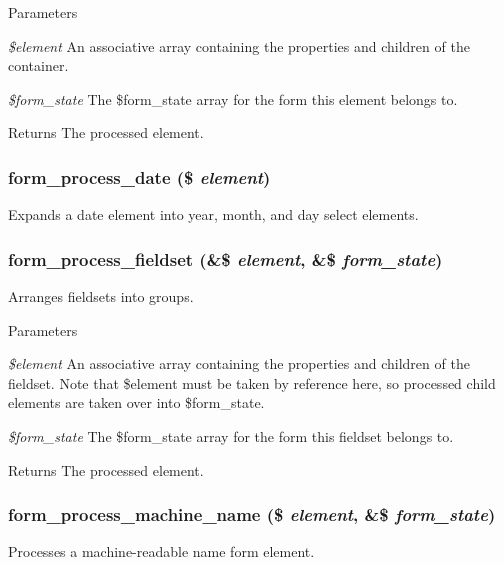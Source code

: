 \begin{DoxyParams}{Parameters}
\item[{\em \$element}]An associative array containing the properties and children of the container. \item[{\em \$form\_\-state}]The \$form\_\-state array for the form this element belongs to.\end{DoxyParams}
\begin{DoxyReturn}{Returns}
The processed element. 
\end{DoxyReturn}
\hypertarget{group__form__api_gabc6b74cff84954f970d4997390473160}{
\subsubsection[{form\_\-process\_\-date}]{\setlength{\rightskip}{0pt plus 5cm}form\_\-process\_\-date (\$ {\em element})}}
\label{group__form__api_gabc6b74cff84954f970d4997390473160}
Expands a date element into year, month, and day select elements. \hypertarget{group__form__api_gae2acfa7f531c487ac930d3a819ee63b5}{
\subsubsection[{form\_\-process\_\-fieldset}]{\setlength{\rightskip}{0pt plus 5cm}form\_\-process\_\-fieldset (\&\$ {\em element}, \/  \&\$ {\em form\_\-state})}}
\label{group__form__api_gae2acfa7f531c487ac930d3a819ee63b5}
Arranges fieldsets into groups.


\begin{DoxyParams}{Parameters}
\item[{\em \$element}]An associative array containing the properties and children of the fieldset. Note that \$element must be taken by reference here, so processed child elements are taken over into \$form\_\-state. \item[{\em \$form\_\-state}]The \$form\_\-state array for the form this fieldset belongs to.\end{DoxyParams}
\begin{DoxyReturn}{Returns}
The processed element. 
\end{DoxyReturn}
\hypertarget{group__form__api_gacc2045f1fc86919221685bd809d22812}{
\subsubsection[{form\_\-process\_\-machine\_\-name}]{\setlength{\rightskip}{0pt plus 5cm}form\_\-process\_\-machine\_\-name (\$ {\em element}, \/  \&\$ {\em form\_\-state})}}
\label{group__form__api_gacc2045f1fc86919221685bd809d22812}
Processes a machine-\/readable name form element.


